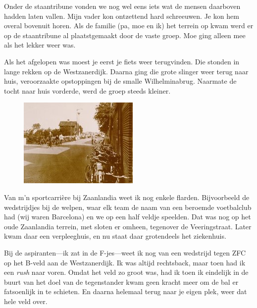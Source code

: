 \documentclass[12pt,twoside, openright]{memoir}
\begin{document}
Onder de staantribune vonden we nog wel eens iets wat de mensen daarboven hadden laten vallen. Mijn vader kon ontzettend hard schreeuwen. Je kon hem overal bovenuit horen. Als de familie (pa, moe en ik) het terrein op kwam werd er op de staantribune al plaatstgemaakt door de vaste groep. Moe ging alleen mee als het lekker weer was. 

Als het afgelopen was moest je eerst je fiets weer terugvinden. Die stonden in lange rekken op de Westzanerdijk. Daarna ging die grote slinger weer terug naar huis, veroorzaakte opstoppingen bij de smalle Wilhelminabrug. Naarmate de tocht naar huis vorderde, werd de groep steeds kleiner. 

\begin{figure}
\includegraphics[width=\textwidth]{img/ch11/zfc}
\end{figure}

Van m’n sportcarrière bij Zaanlandia weet ik nog enkele flarden. Bijvoorbeeld de wedstrijdjes bij de welpen, waar elk team de naam van een beroemde voetbalclub had (wij waren Barcelona) en we op een half veldje speelden. Dat was nog op het oude Zaanlandia terrein, met sloten er omheen, tegenover de Veeringstraat. Later kwam daar een verpleeghuis, en nu staat daar grotendeels het ziekenhuis.

Bij de aspiranten---ik zat in de F-jes---weet ik nog van een wedstrijd tegen ZFC op het B-veld aan de Westzanerdijk. Ik was altijd rechtsback, maar toen had ik een \emph{rush} naar voren. Omdat het veld zo groot was, had ik toen ik eindelijk in de buurt van het doel van de tegenstander kwam geen kracht meer om de bal er fatsoenlijk in te schieten. En daarna helemaal terug naar je eigen plek, weer dat hele veld over. 
\end{document}

